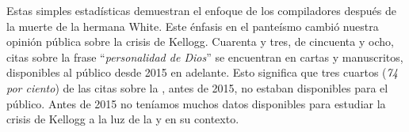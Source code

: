 Estas simples estadísticas demuestran el enfoque de los compiladores después de la muerte de la hermana White. Este énfasis en el panteísmo cambió nuestra opinión pública sobre la crisis de Kellogg. Cuarenta y tres, de cincuenta y ocho, citas sobre la frase “\textit{personalidad de Dios}” se encuentran en cartas y manuscritos, disponibles al público desde 2015 en adelante. Esto significa que tres cuartos (\textit{74 por ciento}) de las citas sobre la , antes de 2015, no estaban disponibles para el público. Antes de 2015 no teníamos muchos datos disponibles para estudiar la crisis de Kellogg a la luz de la  y en su contexto.





% 
